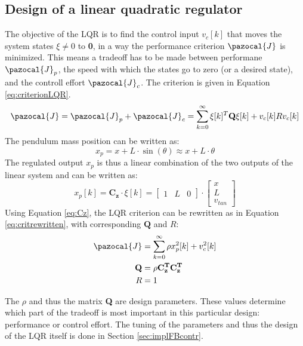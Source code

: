 \documentclass[a4paper,kul]{kulakarticle} %
\newcommand{\J}{\pazocal{J}}
\begin{document}
	\subsection{Design of a linear quadratic regulator}
	\label{sec:designLQR}
	The objective of the LQR is to find the control input $v_c[k]$ that moves the system states $\xi \neq 0$ to \textbf{0}, in a way the performance criterion $\J$ is minimized. This means a tradeoff has to be made between performane $\J_p$, the speed with which the states go to zero (or a desired state), and the controll effort $\J_c$. The criterion is given in Equation \ref{eq:criterionLQR}. 
	\begin{equation}
	\J = \J_p + \J_c =  \sum_{k=0}^{\infty}\mathbf{\xi}[k]^T\mathbf{Q}\mathbf{\xi}[k] + v_c[k]Rv_c[k]
	\label{eq:criterionLQR}
	\end{equation}
	The pendulum mass position can be written as:
	\begin{equation}
	x_p = x + L\cdot \sin(\theta) \approx x + L\cdot \theta
	\label{eq:xp}
	\end{equation}
	The regulated output $x_p$ is thus a linear combination of the two outputs of the linear system and can be written as:
	\begin{equation}
		x_p[k] = \mathbf{C_z}\cdot\xi[k] = \begin{bmatrix}
		1&L&0
		\end{bmatrix}\cdot\begin{bmatrix}
		x\\L\\v_{tan}
		\end{bmatrix}
		\label{eq:Cz}
	\end{equation}
	Using Equation \ref{eq:Cz}, the LQR criterion can be rewritten as in Equation \ref{eq:critrewritten}, with corresponding $\mathbf{Q}$ and $R$:
	\begin{equation}
	\begin{split}
		\J &=  \sum_{k=0}^{\infty}\rho x_p^2[k] + v_c^2[k]\\
		\mathbf{Q} &= \rho \mathbf{C_z^T}\mathbf{C_z^T}\\
		R &= 1
	\end{split}
	\label{eq:critrewritten}
	\end{equation}
	
	
	The $\rho$ and thus the matrix \textbf{Q} are design parameters. These values determine which part of the tradeoff is most important in this particular design: performance or control effort. The tuning of the parameters and thus the design of the LQR itself is done in Section \ref{sec:implFBcontr}. 
	
\end{document}
